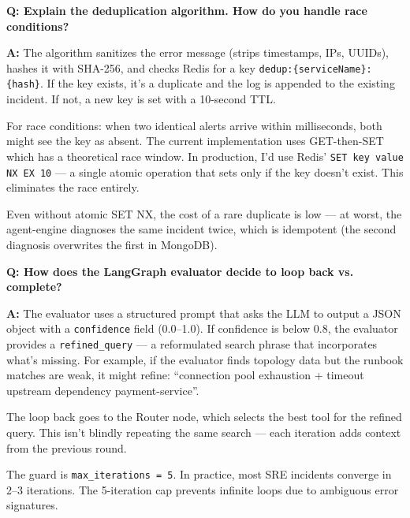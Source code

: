 \documentclass[11pt,a4paper]{article}
\begin{document}
\begin{interviewbox}
\textbf{Q: Explain the deduplication algorithm. How do you handle race conditions?}

\textbf{A:} The algorithm sanitizes the error message (strips timestamps, IPs, UUIDs), hashes it with SHA-256, and checks Redis for a key \texttt{dedup:\{serviceName\}:\{hash\}}. If the key exists, it's a duplicate and the log is appended to the existing incident. If not, a new key is set with a 10-second TTL.

For race conditions: when two identical alerts arrive within milliseconds, both might see the key as absent. The current implementation uses GET-then-SET which has a theoretical race window. In production, I'd use Redis' \texttt{SET key value NX EX 10} — a single atomic operation that sets only if the key doesn't exist. This eliminates the race entirely.

Even without atomic SET NX, the cost of a rare duplicate is low — at worst, the agent-engine diagnoses the same incident twice, which is idempotent (the second diagnosis overwrites the first in MongoDB).
\end{interviewbox}

\begin{interviewbox}
\textbf{Q: How does the LangGraph evaluator decide to loop back vs. complete?}

\textbf{A:} The evaluator uses a structured prompt that asks the LLM to output a JSON object with a \texttt{confidence} field (0.0--1.0). If confidence is below 0.8, the evaluator provides a \texttt{refined\_query} — a reformulated search phrase that incorporates what's missing. For example, if the evaluator finds topology data but the runbook matches are weak, it might refine: ``connection pool exhaustion + timeout upstream dependency payment-service''.

The loop back goes to the Router node, which selects the best tool for the refined query. This isn't blindly repeating the same search — each iteration adds context from the previous round.

The guard is \texttt{max\_iterations = 5}. In practice, most SRE incidents converge in 2--3 iterations. The 5-iteration cap prevents infinite loops due to ambiguous error signatures.
\end{interviewbox}
\end{document}
